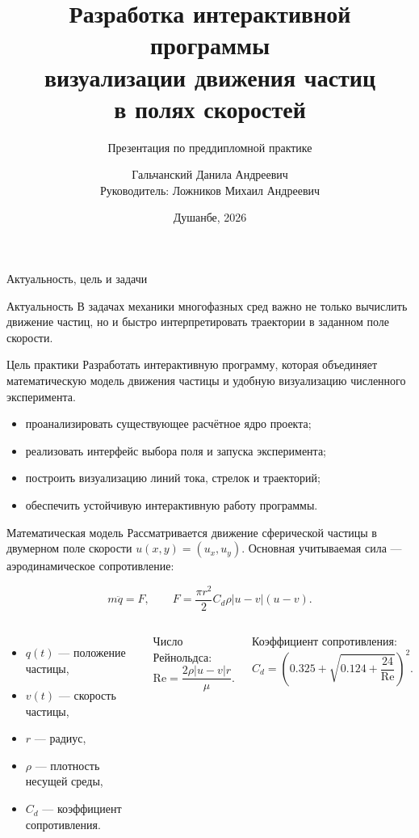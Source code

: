 \documentclass[aspectratio=169,12pt]{beamer}
\title{Разработка интерактивной программы\\визуализации движения частиц\\в полях скоростей}
\subtitle{Презентация по преддипломной практике}
\author{Гальчанский Данила Андреевич\\\small Руководитель: Ложников Михаил Андреевич}
\institute{МГУ имени М. В. Ломоносова\\Филиал в городе Душанбе}
\date{Душанбе, 2026}
\begin{document}
\begin{frame}
    \titlepage
\end{frame}

\begin{frame}{Актуальность, цель и задачи}
\begin{block}{Актуальность}
В задачах механики многофазных сред важно не только вычислить движение частиц,
но и быстро интерпретировать траектории в заданном поле скорости.
\end{block}

\begin{block}{Цель практики}
Разработать интерактивную программу, которая объединяет математическую модель
движения частицы и удобную визуализацию численного эксперимента.
\end{block}

\begin{itemize}
    \item проанализировать существующее расчётное ядро проекта;
    \item реализовать интерфейс выбора поля и запуска эксперимента;
    \item построить визуализацию линий тока, стрелок и траекторий;
    \item обеспечить устойчивую интерактивную работу программы.
\end{itemize}
\end{frame}

\begin{frame}{Математическая модель}
Рассматривается движение сферической частицы в двумерном поле скорости
$u(x,y) = (u_x, u_y)$. Основная учитываемая сила --- аэродинамическое сопротивление:

\begin{equation*}
    m\ddot q = F, \qquad
    F = \frac{\pi r^2}{2} C_d \rho |u-v|(u-v).
\end{equation*}

\begin{columns}[T]
\begin{itemize}
    \item $q(t)$ --- положение частицы,
    \item $v(t)$ --- скорость частицы,
    \item $r$ --- радиус,
    \item $\rho$ --- плотность несущей среды,
    \item $C_d$ --- коэффициент сопротивления.
\end{itemize}

Число Рейнольдса:
\begin{equation*}
    \mathrm{Re} = \frac{2\rho |u-v| r}{\mu}.
\end{equation*}

Коэффициент сопротивления:
\begin{equation*}
    C_d = \left(0.325 + \sqrt{0.124 + \frac{24}{\mathrm{Re}}}\right)^2.
\end{equation*}
\end{columns}
\end{frame}
\end{document}
